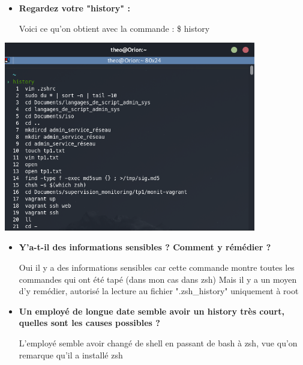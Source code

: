 \documentclass[12pt]{article}
\begin{document}
\begin{itemize}
  \item \textbf{Regardez votre "history" :}

  \vspace{0.3cm}

  Voici ce qu'on obtient avec la commande : \$ history
\end{itemize}
\vspace{0.3cm}

\includegraphics[width=11cm]{images/screen-term-td4.png}
\vspace{0.3cm}

\begin{itemize}
  \item \textbf{Y'a-t-il des informations sensibles ? Comment y rémédier ?}

  \vspace{0.3cm}

  Oui il y a des informations sensibles car cette commande montre toutes les commandes qui ont été tapé (dans mon cas dans zsh) \newline
  Mais il y a un moyen d'y remédier, autorisé la lecture au fichier ".zsh\_history" uniquement à root
\end{itemize}
\vspace{0.3cm}

\begin{itemize}
  \item \textbf{Un employé de longue date semble avoir un history très court, quelles sont les causes possibles ?}

  \vspace{0.3cm}

  L'employé semble avoir changé de shell en passant de bash à zsh, vue qu'on remarque qu'il a installé zsh
\end{itemize}
\vspace{0.3cm}
\end{document}
